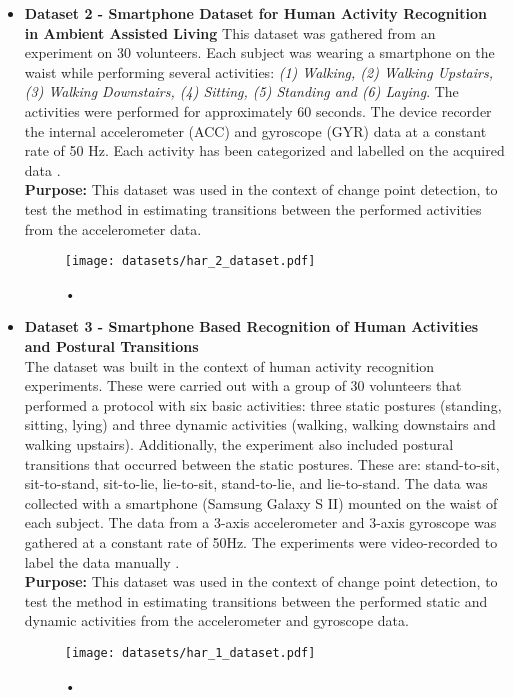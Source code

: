 \begin{itemize}
\item \textbf{Dataset 2 - Smartphone Dataset for Human Activity Recognition in Ambient Assisted Living} This dataset was gathered from an experiment on 30 volunteers. Each subject was wearing a smartphone on the waist while performing several activities: \textit{(1) Walking, (2) Walking Upstairs, (3) Walking Downstairs, (4) Sitting, (5) Standing and (6) Laying}. The activities were performed for approximately 60 seconds. The device recorder the internal accelerometer (ACC) and gyroscope (GYR) data at a constant rate of 50 Hz. Each activity has been categorized and labelled on the acquired data \cite{dataset2, dataset2_2}.\\
\textbf{Purpose:} This dataset was used in the context of change point detection, to test the method in estimating transitions between the performed activities from the accelerometer data.

\begin{figure}
\centering
\texttt{[image: datasets/har\_2\_dataset.pdf]}
\caption{•}
\label{fig:har2_dataset}
\end{figure}
    
\item \textbf{Dataset 3 - Smartphone Based Recognition of Human Activities and Postural Transitions}\\
The dataset was built in the context of human activity recognition experiments. These were carried out with a group of 30 volunteers that performed a protocol with six basic activities: three static postures (standing, sitting, lying) and three dynamic activities (walking, walking downstairs and walking upstairs). Additionally, the experiment also included postural transitions that occurred between the static postures. These are: stand-to-sit, sit-to-stand, sit-to-lie, lie-to-sit, stand-to-lie, and lie-to-stand. The data was collected with a smartphone (Samsung Galaxy S II) mounted on the waist of each subject. The data from a 3-axis accelerometer and 3-axis gyroscope was gathered at a constant rate of 50Hz. The experiments were video-recorded to label the data manually \cite{dataset3}.\\
\textbf{Purpose:} This dataset was used in the context of change point detection, to test the method in estimating transitions between the performed static and dynamic activities from the accelerometer and gyroscope data.

\begin{figure}
\centering
\texttt{[image: datasets/har\_1\_dataset.pdf]}
\caption{•}
\label{fig:har1_dataset}
\end{figure}    
    

\end{itemize}
